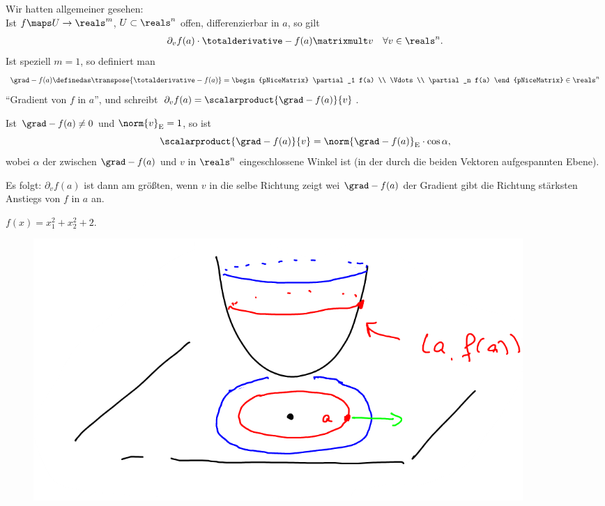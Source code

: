 \begin{bemdef}
    Wir hatten allgemeiner gesehen:\\
    Ist \( f\maps U\to \reals^m \), \( U\subset \reals^n \) offen, differenzierbar in \( a \), so gilt
    \begin{align*}
        \partial_v f(a)\cdot \totalderivative-{f}(a)\matrixmult v\quad \forall v\in \reals^n.
    \end{align*}
    Ist speziell \( m=1 \), so definiert man
    \begin{align*}
        \grad-{f(a)}\definedas \transpose{\totalderivative-{f}(a)}=\begin{pNiceMatrix} \partial_1 f(a) \\ \Vdots \\ \partial_n f(a) \end{pNiceMatrix}\in \reals^n
    \end{align*}
    \enquote{Gradient von \( f \) in \( a \)}, und schreibt \( \partial_v f(a)=\scalarproduct{\grad-{f(a)}}{v} \).

    Ist \( \grad-{f(a)}\neq 0 \) und \( \norm{v}_{\text{E}}=1 \), so ist
    \begin{equation*}
        \scalarproduct{\grad-{f(a)}}{v}=\norm{\grad-{f(a)}}_{\text{E}}\cdot\cos \alpha,
    \end{equation*}
    wobei \( \alpha \) der zwischen \( \grad-{f(a)} \) und \( v \) in \( \reals^n \) eingeschlossene Winkel ist (in der durch die beiden Vektoren aufgespannten Ebene).

    Es folgt: \( \partial_v f(a) \) ist dann am größten, wenn \( v \) in die selbe Richtung zeigt wei \( \grad-{f(a)} \) \timplies der Gradient gibt die Richtung stärksten Anstiegs von \( f \) in \( a \) an.
\end{bemdef}
\begin{beispiel*}
    \( f(x)=x_1^2+x_2^2+2 \).
    \begin{figure}[H]
        \centering
        \includegraphics[width=0.5\linewidth]{figures/gradient_beispiel_parabel}
        \label{fig:gradient_beispiel_parabel}
    \end{figure}
\end{beispiel*}
